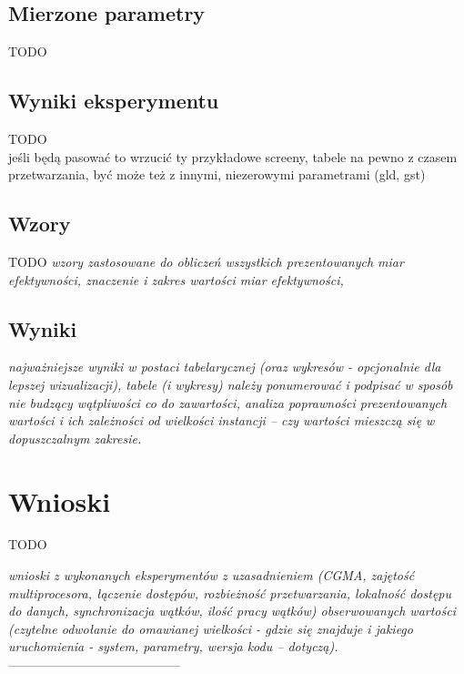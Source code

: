 \documentclass[12pt,a4paper]{article}
\begin{document}
\subsection{Mierzone parametry}

TODO

\subsection{Wyniki eksperymentu}

TODO\\
jeśli będą pasować to wrzucić ty przykładowe screeny, tabele na pewno z czasem przetwarzania, być może też z innymi, niezerowymi parametrami (gld, gst)

\subsection{Wzory}

TODO
\textit{wzory zastosowane do obliczeń wszystkich prezentowanych miar efektywności, znaczenie i zakres wartości
miar efektywności,}

\subsection{Wyniki}

\textit{najważniejsze wyniki w postaci tabelarycznej (oraz wykresów - opcjonalnie dla lepszej wizualizacji), tabele (i
wykresy) należy ponumerować i podpisać w sposób nie budzący wątpliwości co do zawartości, analiza
poprawności prezentowanych wartości i ich zależności od wielkości instancji – czy wartości mieszczą się w
dopuszczalnym zakresie.}

\section{Wnioski}

TODO

\textit{wnioski z wykonanych eksperymentów z uzasadnieniem (CGMA, zajętość multiprocesora, łączenie dostępów,
rozbieżność przetwarzania, lokalność dostępu do danych, synchronizacja wątków, ilość pracy wątków)
obserwowanych wartości (czytelne odwołanie do omawianej wielkości - gdzie się znajduje i jakiego
uruchomienia - system, parametry, wersja kodu – dotyczą).}\\
-----------------------------------------
\end{document}
